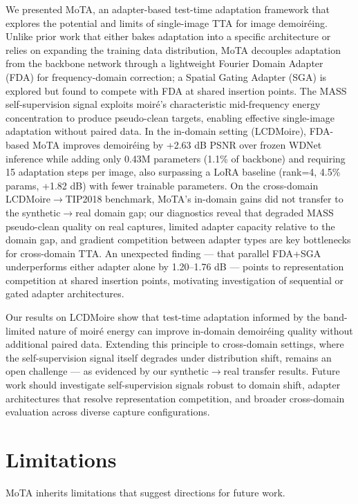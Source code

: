 \documentclass[10pt,twocolumn,letterpaper]{article}
\begin{document}
We presented MoTA, an adapter-based test-time adaptation framework that explores the potential and limits of single-image TTA for image demoir\'{e}ing. Unlike prior work that either bakes adaptation into a specific architecture or relies on expanding the training data distribution, MoTA decouples adaptation from the backbone network through a lightweight Fourier Domain Adapter (FDA) for frequency-domain correction; a Spatial Gating Adapter (SGA) is explored but found to compete with FDA at shared insertion points. The MASS self-supervision signal exploits moir\'{e}'s characteristic mid-frequency energy concentration to produce pseudo-clean targets, enabling effective single-image adaptation without paired data. In the in-domain setting (LCDMoire), FDA-based MoTA improves demoir\'{e}ing by +2.63 dB PSNR over frozen WDNet inference while adding only 0.43M parameters (1.1\% of backbone) and requiring 15 adaptation steps per image, also surpassing a LoRA baseline (rank=4, 4.5\% params, +1.82 dB) with fewer trainable parameters. On the cross-domain LCDMoire$\to$TIP2018 benchmark, MoTA's in-domain gains did not transfer to the synthetic$\to$real domain gap; our diagnostics reveal that degraded MASS pseudo-clean quality on real captures, limited adapter capacity relative to the domain gap, and gradient competition between adapter types are key bottlenecks for cross-domain TTA. An unexpected finding --- that parallel FDA+SGA underperforms either adapter alone by 1.20--1.76 dB --- points to representation competition at shared insertion points, motivating investigation of sequential or gated adapter architectures.

Our results on LCDMoire show that test-time adaptation informed by the band-limited nature of moir\'{e} energy can improve in-domain demoir\'{e}ing quality without additional paired data. Extending this principle to cross-domain settings, where the self-supervision signal itself degrades under distribution shift, remains an open challenge --- as evidenced by our synthetic$\to$real transfer results. Future work should investigate self-supervision signals robust to domain shift, adapter architectures that resolve representation competition, and broader cross-domain evaluation across diverse capture configurations.


\FloatBarrier
\section*{Limitations}

MoTA inherits limitations that suggest directions for future work.
\end{document}
